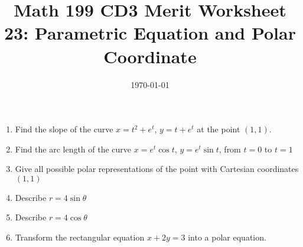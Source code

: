 
\usepackage{fullpage,amsmath,amssymb,amsthm}

\newcommand{\D}{\displaystyle}

\title{Math 199 CD3 Merit Worksheet 23: Parametric Equation and Polar Coordinate}
\date{\today}



\maketitle
\begin{enumerate}
	\item Find the slope of the curve $x=t^2+e^t$, $y=t+e^t$ at the point $(1,1)$.	
	\vfill
	\item Find the arc length of the curve $x=e^t\cos t$, $y=e^t\sin t$, from $t=0$ to $t= 1$
	\vfill
	\item Give all possible polar representations of the point with Cartesian coordinates $(1,1)$
	\vfill
	\newpage
	\item Describe $r=4\sin \theta$
\vfill
	\item Describe $r=4\cos \theta$
	\vfill
	\item Transform the rectangular equation $x + 2y = 3$ into a polar equation.
	\vfill
\end{enumerate}
